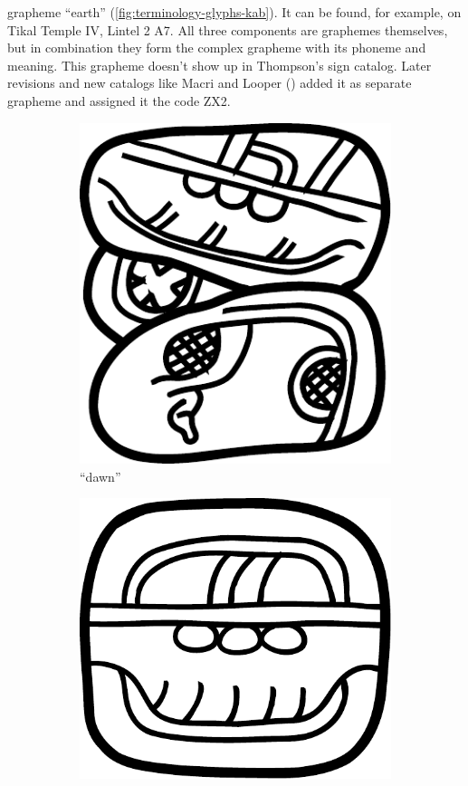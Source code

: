 \documentclass[../main.tex]{subfiles}
\begin{document}
grapheme  ``earth'' (\ref{fig:terminology-glyphs-kab}).
It can be found, for example, on Tikal Temple IV, Lintel 2 A7.
All three components are graphemes themselves, but in combination they form the complex 
grapheme  with its phoneme and meaning.
This grapheme doesn't show up in Thompson's sign catalog.
Later revisions and new catalogs like Macri and Looper (\cite{macrilooper2003}) added it as
separate grapheme and assigned it the code ZX2.
\begin{figure}
    \centering
    \begin{subfigure}[b]{0.24\textwidth}
        \centering
        \includegraphics[height=\glyphblockheight]{img/grapheme-PAS}
        \caption{ ``dawn''}
        \label{fig:terminology-glyphs-pas}
    \end{subfigure}
    \hfill
    \begin{subfigure}[b]{0.24\textwidth}
        \centering
        \includegraphics[height=\glyphblockheight]{img/grapheme-CHAN}

\end{subfigure}
\end{figure}
\end{document}
